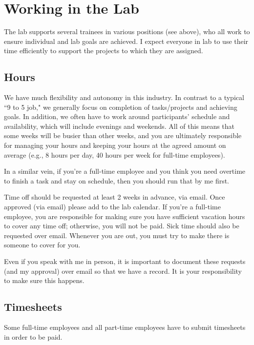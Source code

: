 \documentclass[letterpaper,11pt,oneside]{memoir}
\begin{document}
\section{Working in the Lab}

The lab supports several trainees in various positions (see above), who all work to ensure individual and lab goals are achieved. I expect everyone in lab to use their time efficiently to support the projects to which they are assigned. 

\subsection{Hours}
We have much flexibility and autonomy in this industry. In contrast to a typical ``9 to 5 job," we generally focus on completion of tasks/projects and achieving goals. In addition, we often have to work around participants' schedule and availability, which will include evenings and weekends. All of this means that some weeks will be busier than other weeks, and you are ultimately responsible for managing your hours and keeping your hours at the agreed amount on average (e.g., 8 hours per day, 40 hours per week for full-time employees). 

In a similar vein, if you're a full-time employee and you think you need overtime to finish a task and stay on schedule, then you should run that by me first.

Time off should be requested at least 2 weeks in advance, via email. Once approved (via email) please add to the lab calendar. If you're a full-time employee, you are responsible for making sure you have sufficient vacation hours to cover any time off; otherwise, you will not be paid. Sick time should also be requested over email. Whenever you are out, you must try to make there is someone to cover for you.

\begin{shaded}
\noindent Even if you speak with me in person, it is important to document these requests (and my approval) over email so that we have a record. It is your responsibility to make sure this happens.
\end{shaded}

\subsection{Timesheets}

Some full-time employees and all part-time employees have to submit timesheets in order to be paid. 
\end{document}
